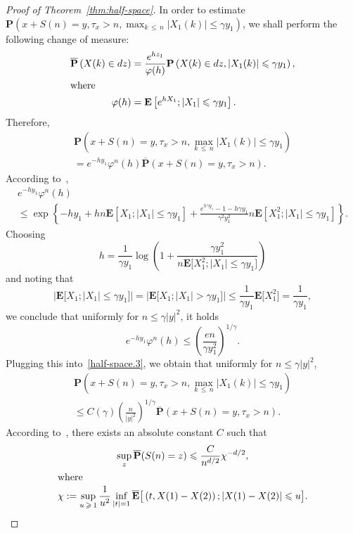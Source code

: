 \documentclass[AHL,Unicode,longabstracts,published]{cedram}
\newcommand{\pr}{\mathbf{P}}
\newcommand{\e}{\mathbf{E}}
\renewcommand{\le}{\leqslant}
\renewcommand{\ge}{\geqslant}
\begin{document}
\begin{proof}[Proof of Theorem~\ref{thm:half-space}]
In order to estimate $\pr(x+S(n)=y,\tau_x>n,\max_{k\,\le\,n}| X_1(k)|\le\gamma y_1)$, we shall perform the following change of measure:
\begin{align*}
\overline{\pr}\left(X(k)\in dz\right) &=\frac{e^{hz_1}}{\varphi(h)}\pr\left(X(k)\in dz,\left| X_1(k)\right|\le\gamma y_1\right),
\\
\intertext{where}
\varphi(h) &=\e\left[e^{hX_1};| X_1|\le \gamma y_1\right].
\end{align*}
Therefore,
\begin{multline}\label{half-space.3}
\pr\left(x+S(n)=y,\tau_x>n,\max_{k\,\le\,n}| X_1(k)|\le\gamma y_1\right)\\
=e^{-hy_1}\varphi^n(h)\overline{\pr}\left(x+S(n)=y,\tau_x>n\right).
\end{multline}
According to~\cite[Equation~(21)]{FuNa-71},
\begin{multline*}
e^{-hy_1}\varphi^n(h)\\
\le
\exp\left\{-hy_1+hn\e\left[X_1;|X_1|\le\gamma y_1\right]+\frac{e^{h\gamma y_1}-1-h\gamma y_1}{\gamma^2y_1^2} n\e\left[X_1^2;|X_1|\le\gamma y_1\right]\right\}.
\end{multline*}
Choosing
\begin{equation}\label{half-space.4}
h=\frac{1}{\gamma y_1}\log\left(1+\frac{\gamma y_1^2}{n\e\big[X_1^2;|X_1|\le\gamma y_1\big]}\right)
\end{equation}
and noting that
\[
\big|\e\big[X_1;|X_1|\le\gamma y_1\big]\big| =\big|\e\big[X_1;|X_1|>\gamma y_1\big]\big|
\le\frac{1}{\gamma y_1}\e\big[X_1^2\big]=\frac{1}{\gamma y_1},
\]
we conclude that uniformly for $n\le \gamma|y|^2$, it holds
\[
e^{-hy_1}\varphi^n(h)\le \left(\frac{en}{\gamma y_1^2}\right)^{1/\gamma}.
\]
Plugging this into~\eqref{half-space.3}, we obtain that uniformly for $n\le \gamma| y|^2$,
\begin{multline}\label{eq:half-space.5}
\pr\left(x+S(n)=y,\tau_x>n,\max_{k\,\le\,n}| X_1(k)|\le\gamma y_1\right)\\
\le C(\gamma)\left(\frac{n}{|y|^2}\right)^{1/\gamma}\overline{\pr}\left(x+S(n)=y,\tau_x>n\right).
\end{multline}
According to~\cite[Theorem~6.2]{Es-68}, there exists an absolute constant $C$ such that
\begin{gather*}
\sup_z\overline{\pr}(S(n)=z)\le\frac{C}{n^{d/2}}\chi^{-d/2},
\\
\intertext{where}
\chi:=\sup_{u\,\ge\,1}\frac{1}{u^2}\inf_{|t|=1}\overline{\e}\big[\left(t,X(1)-X(2)\right);\left| X(1)-X(2)\right|\le u\big].
\end{gather*}

\end{proof}
\end{document}
